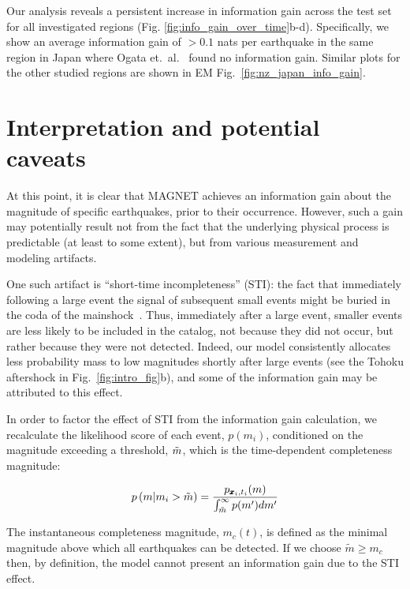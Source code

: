 \documentclass[pdflatex]{sn-jnl}
\begin{document}
Our analysis reveals a persistent increase in information gain across the test set for all investigated regions (Fig. \ref{fig:info_gain_over_time}b-d). Specifically, we show an average information gain of $>0.1$ nats per earthquake in the same region in Japan where Ogata et.~al.~\cite{ogata_exploring_2018} found no information gain. Similar plots for the other studied regions are shown in EM Fig.~\ref{fig:nz_japan_info_gain}.

\section{Interpretation and potential caveats}
At this point, it is clear that MAGNET achieves an information gain about the magnitude of specific earthquakes, prior to their occurrence. However, such a gain may potentially result not from the fact that the underlying physical process is predictable (at least to some extent), but from various measurement and modeling artifacts. 

One such artifact is ``short-time incompleteness'' (STI): the fact that immediately following a large event the signal of subsequent small events might be buried in the coda of the mainshock~\cite{kagan_short-term_2004, stockman_forecasting_2023}. Thus, immediately after a large event, smaller events are less likely to be included in the catalog, not because they did not occur, but rather because they were not detected. Indeed, our model consistently allocates less probability mass to low magnitudes shortly after large events (see the Tohoku aftershock in Fig.~\ref{fig:intro_fig}b), and some of the information gain may be attributed to this effect.  

In order to factor the effect of STI from the information gain calculation, we recalculate the likelihood score of each event, $p(m_i)$, conditioned on the magnitude exceeding a threshold, $\Tilde{m}$, which is the time-dependent completeness magnitude:

\begin{equation}
    p \left( m \vert m_i > \Tilde{m} \right) = \frac{p_{\pmb{x}_i, t_i}(m)} {\int_{\Tilde{m}}^{\infty} p(m') dm'}
    \label{eq:conditioned_likelihood}
\end{equation}

The instantaneous completeness magnitude, $m_c(t)$, is defined as the minimal magnitude above which all earthquakes can be detected. If we choose $\tilde m \geq m_c$ then, by definition, the model cannot present an information gain due to the STI effect.
\end{document}
